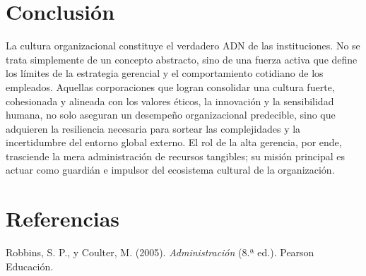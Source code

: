 \documentclass{article}
\begin{document}
    \section{Conclusión}
    La cultura organizacional constituye el verdadero ADN de las instituciones. No se trata simplemente de un concepto abstracto, sino de una fuerza activa que define los límites de la estrategia gerencial y el comportamiento cotidiano de los empleados. Aquellas corporaciones que logran consolidar una cultura fuerte, cohesionada y alineada con los valores éticos, la innovación y la sensibilidad humana, no solo aseguran un desempeño organizacional predecible, sino que adquieren la resiliencia necesaria para sortear las complejidades y la incertidumbre del entorno global externo. El rol de la alta gerencia, por ende, trasciende la mera administración de recursos tangibles; su misión principal es actuar como guardián e impulsor del ecosistema cultural de la organización.

    \section{Referencias}
    Robbins, S. P., y Coulter, M. (2005). \textit{Administración} (8.ª ed.). Pearson Educación.
\end{document}
